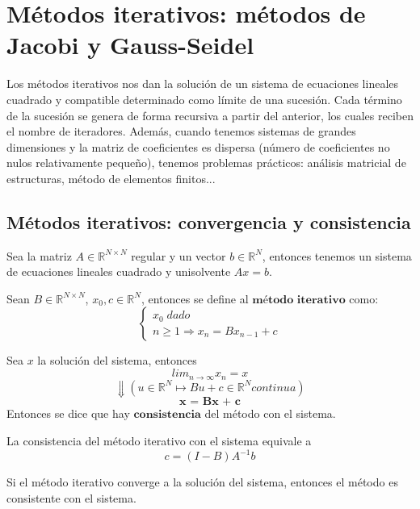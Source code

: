 \section{Métodos iterativos: métodos de Jacobi y Gauss-Seidel}
Los métodos iterativos nos dan la solución de un sistema de ecuaciones lineales cuadrado y compatible determinado como límite de una sucesión. Cada término de la sucesión se genera de forma recursiva a partir del anterior, los cuales reciben el nombre de iteradores. Además, cuando tenemos sistemas de grandes dimensiones y la matriz de coeficientes es dispersa (número de coeficientes no nulos relativamente pequeño), tenemos problemas prácticos: análisis matricial de estructuras, método de elementos finitos...

\subsection{Métodos iterativos: convergencia y consistencia}
Sea la matriz $A \in \mathbb{R}^{N \times N}$ regular y un vector $b \in \mathbb{R}^N$, entonces tenemos un sistema de ecuaciones lineales cuadrado y unisolvente $Ax = b$.

\begin{ndef}
Sean $B \in \mathbb{R}^{N \times N}$, $x_0,c \in \mathbb{R}^N$, entonces se define al $\textbf{método iterativo}$ como:
\[ \left\{ \begin{array}{c}
x_0 \; dado \\
n \geq 1 \Rightarrow x_n = Bx_{n-1}+c
\end{array}
\right. \]
\end{ndef}

\begin{ndef}[Consistencia]
Sea $x$ la solución del sistema, entonces
\[ lim_{n \rightarrow \infty}x_n = x \]
\[ \Downarrow (u \in \mathbb{R}^N \mapsto Bu + c \in \mathbb{R}^N continua) \]
\[ \textbf{x = Bx + c} \]
Entonces se dice que hay $\textbf{consistencia}$ del método con el sistema.
\end{ndef}

\begin{nprop}
La consistencia del método iterativo con el sistema equivale a
\[ c = (I-B)A^{-1}b \]
\end{nprop}

\begin{nprop}
Si el método iterativo converge a la solución del sistema, entonces el método es consistente con el sistema.
\end{nprop}


